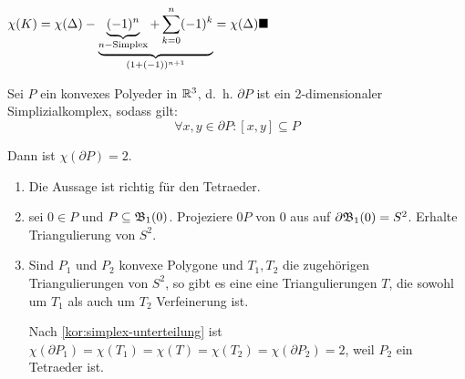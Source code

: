 \begin{beweis}
    $\chi(K) = \chi(\Delta) - \underbrace{\underbrace{(-1)^n}_{n-\text{Simplex}} + \sum_{k=0}^n (-1)^k}_{(1+(-1))^{n+1}} = \chi(\Delta) \qed$
\end{beweis}

\begin{satz}%
    Sei $P$ ein konvexes Polyeder in $\mathbb{R}^3$, d.~h. $\partial P$ ist
    ein 2-dimensionaler Simplizialkomplex, sodass gilt:
    \[\forall x,y \in \partial P: [x,y] \subseteq P\]

    Dann ist $\chi(\partial P) = 2$.
\end{satz}

\begin{beweis}\leavevmode
    \begin{enumerate}[label=\arabic*)]
        \item Die Aussage ist richtig für den Tetraeder.
        \item \Obda{} sei $0 \in P$ und $P \subseteq \mathfrak{B}_1(0)$. Projeziere
              $0P$ von $0$ aus auf $\partial \mathfrak{B}_1(0) = S^2$.
              Erhalte Triangulierung von $S^2$.
        \item Sind $P_1$ und $P_2$ konvexe Polygone und $T_1, T_2$
              die zugehörigen Triangulierungen von $S^2$, so gibt es 
              eine eine Triangulierungen $T$, die sowohl um $T_1$ als
              auch um $T_2$ Verfeinerung ist.

              \begin{center}
                  \centering
              \end{center}

              Nach \cref{kor:simplex-unterteilung} ist
              $\chi(\partial P_1) = \chi(T_1) = \chi(T) = \chi(T_2) = \chi(\partial P_2) = 2$,
              weil \obda{} $P_2$ ein Tetraeder ist.
    \end{enumerate}
\end{beweis}

